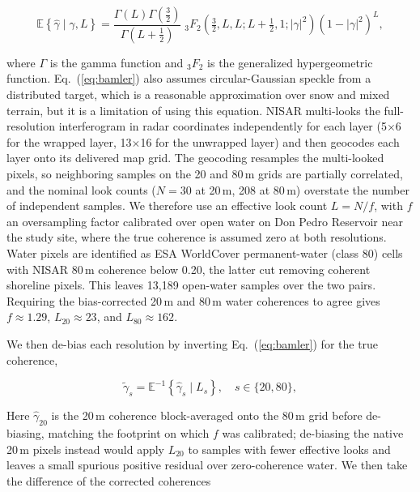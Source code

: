 \documentclass[tc, manuscript]{copernicus}
\begin{document}
\begin{equation}
\mathbb{E}\!\left\{\hat{\gamma}\mid\gamma,L\right\}
= \frac{\Gamma(L)\Gamma\!\left(\tfrac{3}{2}\right)}{\Gamma\!\left(L+\tfrac{1}{2}\right)}\;
{}_{3}F_{2}\!\left(\tfrac{3}{2},L,L;L+\tfrac{1}{2},1;|\gamma|^{2}\right)
\left(1-|\gamma|^{2}\right)^{L},
\label{eq:bamler}
\end{equation}

\noindent where $\Gamma$ is the gamma function and ${}_{3}F_{2}$ is the generalized hypergeometric function. Eq.~(\ref{eq:bamler}) also assumes circular-Gaussian speckle from a distributed target, which is a reasonable approximation over snow and mixed terrain, but it is a limitation of using this equation. NISAR multi-looks the full-resolution interferogram in radar coordinates independently for each layer (5$\times$6 for the wrapped layer, 13$\times$16 for the unwrapped layer) and then geocodes each layer onto its delivered map grid. The geocoding resamples the multi-looked pixels, so neighboring samples on the 20 and 80\,\unit{m} grids are partially correlated, and the nominal look counts ($N = 30$ at 20\,\unit{m}, 208 at 80\,\unit{m}) overstate the number of independent samples. We therefore use an effective look count $L=N/f$, with $f$ an oversampling factor calibrated over open water on Don Pedro Reservoir near the study site, where the true coherence is assumed zero at both resolutions. Water pixels are identified as ESA WorldCover permanent-water (class 80) cells with NISAR 80\,\unit{m} coherence below 0.20, the latter cut removing coherent shoreline pixels. This leaves 13,189 open-water samples over the two pairs. Requiring the bias-corrected 20\,\unit{m} and 80\,\unit{m} water coherences to agree gives $f \approx 1.29$, $L_{20} \approx 23$, and $L_{80} \approx 162$.

We then de-bias each resolution by inverting Eq.~(\ref{eq:bamler}) for the true coherence,

  \begin{equation}
    \tilde{\gamma}_{s} = \mathbb{E}^{-1}\!\left\{\hat{\gamma}_{s}\mid L_{s}\right\},
    \quad s\in\{20,80\},
    \label{eq:debias}
  \end{equation}

\noindent Here $\hat{\gamma}_{20}$ is the 20\,\unit{m} coherence block-averaged onto the 80\,\unit{m} grid before de-biasing, matching the footprint on which $f$ was calibrated; de-biasing the native 20\,\unit{m} pixels instead would apply $L_{20}$ to samples with fewer effective looks and leaves a small spurious positive residual over zero-coherence water. We then take the difference of the corrected coherences
\end{document}
